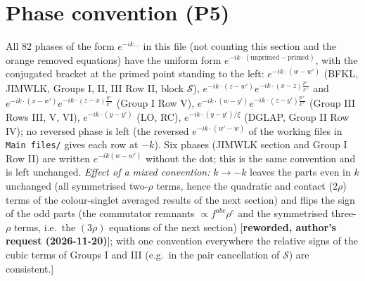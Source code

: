 \documentclass[9pt]{article}
\numberwithin{equation}{section}
\begin{document}
{\color{red}
\section{Phase convention (P5)}
 All 82 phases of the form $e^{-ik\dots}$ in this file (not counting this section and the orange removed equations) have the uniform form $e^{-ik\cdot(\text{unprimed}-\text{primed})}$, with the conjugated bracket at the primed point standing to the left: $e^{-ik\cdot(w-w')}$ (BFKL, JIMWLK, Groups I, II, III Row II, block $\mathcal{S}$), $e^{-ik\cdot(z-w')}e^{-ik\cdot(x-z)\frac{p^{+}}{k^{+}}}$ and $e^{-ik\cdot(x-w')}e^{-ik\cdot(z-x)\frac{q^{+}}{k^{+}}}$ (Group I Row V), $e^{-ik\cdot(w-y')}e^{-ik\cdot(z-y')\frac{p^{+}}{k^{+}}}$ (Group III Rows III, V, VI), $e^{-ik\cdot(y-y')}$ (LO, RC), $e^{-ik\cdot(y-y')/\xi}$ (DGLAP, Group II Row IV); no reversed phase is left (the reversed $e^{-ik\cdot(w'-w)}$ of the working files in \texttt{Main files/} gives each row at $-k$). Six phases (JIMWLK section and Group I Row II) are written $e^{-ik(w-w')}$ without the dot; this is the same convention and is left unchanged. \emph{Effect of a mixed convention:} $k\to-k$ leaves the parts even in $k$ unchanged (all symmetrised two-$\rho$ terms, hence the quadratic and contact ($2\rho$) terms of the colour-singlet averaged results of the next section) and flips the sign of the odd parts (the commutator remnants $\propto f^{abc}\rho^{c}$ and the symmetrised three-$\rho$ terms, i.e.\ the $(3\rho)$ equations of the next section) [\textbf{reworded, author's request (2026-11-20)}]; with one convention everywhere the relative signs of the cubic terms of Groups I and III (e.g.\ in the pair cancellation of $\mathcal{S}$) are consistent.]}\par
\end{document}
